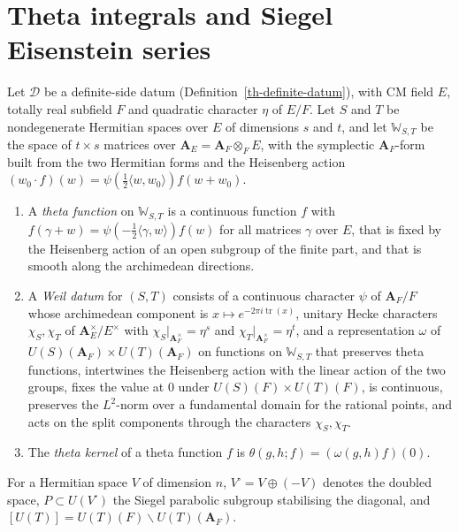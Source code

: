 \section{Theta integrals and Siegel Eisenstein series}\label{section-lit-theta}

\begin{definition}\label{lit-weil-datum}
Let $\mathcal D$ be a definite-side datum
(Definition~\ref{th-definite-datum}), with CM field $E$, totally real
subfield $F$ and quadratic character $\eta$ of $E/F$. Let $S$ and $T$ be
nondegenerate Hermitian spaces over $E$ of dimensions $s$ and $t$, and let
$\mathbb W_{S,T}$ be the space of $t\times s$ matrices over
$\mathbf A_E=\mathbf A_F\otimes_FE$, with the symplectic $\mathbf A_F$-form
built from the two Hermitian forms and the Heisenberg action
$(w_0\cdot f)(w)=\psi(\tfrac12\langle w,w_0\rangle)f(w+w_0)$.
\begin{enumerate}
\item A \emph{theta function} on $\mathbb W_{S,T}$ is a continuous function
  $f$ with $f(\gamma+w)=\psi(-\tfrac12\langle\gamma,w\rangle)f(w)$ for all
  matrices $\gamma$ over $E$, that is fixed by the Heisenberg action of an
  open subgroup of the finite part, and that is smooth along the archimedean
  directions.
\item A \emph{Weil datum} for $(S,T)$ consists of a continuous character
  $\psi$ of $\mathbf A_F/F$ whose archimedean component is
  $x\mapsto e^{-2\pi i\operatorname{tr}(x)}$, unitary Hecke characters
  $\chi_S,\chi_T$ of $\mathbf A_E^\times/E^\times$ with
  $\chi_S|_{\mathbf A_F^\times}=\eta^s$ and $\chi_T|_{\mathbf A_F^\times}=\eta^t$,
  and a representation $\omega$ of $U(S)(\mathbf A_F)\times U(T)(\mathbf A_F)$
  on functions on $\mathbb W_{S,T}$ that preserves theta functions, intertwines
  the Heisenberg action with the linear action of the two groups, fixes the
  value at $0$ under $U(S)(F)\times U(T)(F)$, is continuous, preserves the
  $L^2$-norm over a fundamental domain for the rational points, and acts on the
  split components through the characters $\chi_S,\chi_T$.
\item The \emph{theta kernel} of a theta function $f$ is
  $\theta(g,h;f)=(\omega(g,h)f)(0)$.
\end{enumerate}
For a Hermitian space $V$ of dimension $n$, $V^\square=V\oplus(-V)$ denotes
the doubled space, $P\subset U(V^\square)$ the Siegel parabolic subgroup
stabilising the diagonal, and $[U(T)]=U(T)(F)\backslash U(T)(\mathbf A_F)$.
\end{definition}

